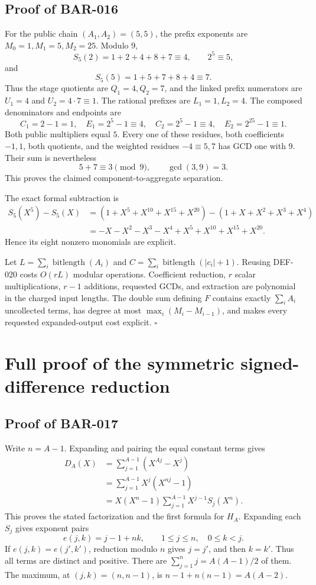 \documentclass[11pt]{article}
\begin{document}
\subsection{Proof of BAR-016}\label{proof:BAR-016}

For the public chain \((A_1,A_2)=(5,5)\), the prefix exponents are
\(M_0=1,M_1=5,M_2=25\). Modulo \(9\),
\[
S_5(2)=1+2+4+8+7\equiv4,\qquad 2^5\equiv5,
\]
and
\[
S_5(5)=1+5+7+8+4\equiv7.
\]
Thus the stage quotients are \(Q_1=4,Q_2=7\), and the linked prefix
numerators are \(U_1=4\) and \(U_2=4\cdot7\equiv1\). The rational prefixes
are \(L_1=1,L_2=4\). The composed denominators and endpoints are
\[
C_1=2-1=1,\quad E_1=2^5-1\equiv4,\quad
C_2=2^5-1\equiv4,\quad E_2=2^{25}-1\equiv1.
\]
Both public multipliers equal \(5\). Every one of these residues, both
coefficients \(-1,1\), both quotients, and the weighted residues
\(-4\equiv5,7\) has GCD one with \(9\). Their sum is nevertheless
\[
5+7\equiv3\pmod9,\qquad\gcd(3,9)=3.
\]
This proves the claimed component-to-aggregate separation.

The exact formal subtraction is
\[
\begin{aligned}
S_5(X^5)-S_5(X)
 &=(1+X^5+X^{10}+X^{15}+X^{20})
   -(1+X+X^2+X^3+X^4)\\
 &=-X-X^2-X^3-X^4+X^5+X^{10}+X^{15}+X^{20}.
\end{aligned}
\]
Hence its eight nonzero monomials are explicit.

Let \(L=\sum_i\operatorname{bitlength}(A_i)\) and
\(C=\sum_i\operatorname{bitlength}(|c_i|+1)\). Reusing DEF-020 costs
\(O(rL)\) modular operations. Coefficient reduction, \(r\) scalar
multiplications, \(r-1\) additions, requested GCDs, and extraction are
polynomial in the charged input lengths. The double sum defining \(F\)
contains exactly \(\sum_iA_i\) uncollected terms, has degree at most
\(\max_i(M_i-M_{i-1})\), and makes every requested expanded-output cost
explicit. \(\square\)

\section{Full proof of the symmetric signed-difference reduction}

\subsection{Proof of BAR-017}\label{proof:BAR-017}

Write \(n=A-1\). Expanding and pairing the equal constant terms gives
\[
\begin{aligned}
D_A(X)
 &=\sum_{j=1}^{A-1}\left(X^{Aj}-X^j\right)\\
 &=\sum_{j=1}^{A-1}X^j\left(X^{nj}-1\right)\\
 &=X(X^n-1)\sum_{j=1}^{A-1}X^{j-1}S_j(X^n).
\end{aligned}
\]
This proves the stated factorization and the first formula for \(H_A\).
Expanding each \(S_j\) gives exponent pairs
\[
e(j,k)=j-1+nk,\qquad 1\le j\le n,\quad 0\le k<j.
\]
If \(e(j,k)=e(j',k')\), reduction modulo \(n\) gives
\(j=j'\), and then \(k=k'\). Thus all terms are distinct and positive.
There are \(\sum_{j=1}^{n}j=A(A-1)/2\) of them. The maximum, at
\((j,k)=(n,n-1)\), is \(n-1+n(n-1)=A(A-2)\).
\end{document}
